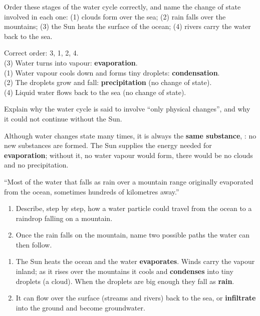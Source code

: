 \begin{exercise}
    Order these stages of the water cycle correctly, and name the change of state involved in each one: (1) clouds form over the sea; (2) rain falls over the mountains; (3) the Sun heats the surface of the ocean; (4) rivers carry the water back to the sea.
    \begin{solu}
        Correct order: 3, 1, 2, 4. \\
        (3) Water turns into vapour: \textbf{evaporation}. \\
        (1) Water vapour cools down and forms tiny droplets: \textbf{condensation}. \\
        (2) The droplets grow and fall: \textbf{precipitation} (no change of state). \\
        (4) Liquid water flows back to the sea (no change of state).
    \end{solu}
\end{exercise}

\begin{exercise}
    Explain why the water cycle is said to involve ``only physical changes'', and why it could not continue without the Sun.
    \begin{solu}
        Although water changes state many times, it is always the \textbf{same substance}, : no new substances are formed. The Sun supplies the energy needed for \textbf{evaporation}; without it, no water vapour would form, there would be no clouds and no precipitation.
    \end{solu}
\end{exercise}

\begin{exercise}
    ``Most of the water that falls as rain over a mountain range originally evaporated from the ocean, sometimes hundreds of kilometres away.''
    \begin{enumerate}[label=\letraminuscula]
        \item Describe, step by step, how a water particle could travel from the ocean to a raindrop falling on a mountain.
        \item Once the rain falls on the mountain, name two possible paths the water can then follow.
    \end{enumerate}
    \begin{solu}
        \begin{enumerate}[label=\alph*)]
            \item The Sun heats the ocean and the water \textbf{evaporates}. Winds carry the vapour inland; as it rises over the mountains it cools and \textbf{condenses} into tiny droplets (a cloud). When the droplets are big enough they fall as \textbf{rain}.
            \item It can flow over the surface (streams and rivers) back to the sea, or \textbf{infiltrate} into the ground and become groundwater.
        \end{enumerate}
    \end{solu}
\end{exercise}

